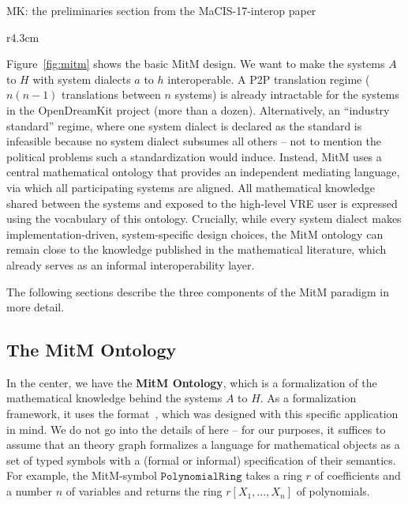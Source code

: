 \begin{newpart}{MK: the preliminaries section from the MaCIS-17-interop paper}
  \begin{wrapfigure}r{4.3cm}\vspace*{-2em}
  \vspace*{-1em}
  \caption{MitM Paradigm}\label{fig:mitm}\vspace*{-1.5em}
\end{wrapfigure}
Figure~\ref{fig:mitm} shows the basic MitM design.
We want to make the systems $A$ to $H$ with system dialects $a$ to $h$ interoperable.
A P2P translation regime ($n(n-1)$ translations between $n$ systems) is already intractable for the systems in the OpenDreamKit project (more than a dozen).
Alternatively, an ``industry standard'' regime, where one system dialect is declared as the standard is infeasible because no system dialect subsumes all others -- not to mention the political problems such a standardization would induce.
Instead, MitM uses a central mathematical ontology that provides an independent mediating language, via which all participating systems are aligned.
All mathematical knowledge shared between the systems and exposed to the high-level VRE user is expressed using the vocabulary of this ontology.
Crucially, while every system dialect makes implementation-driven, system-specific design choices, the MitM ontology can remain close to the knowledge published in the mathematical literature, which already serves as an informal interoperability layer.

The following sections describe the three components of the MitM paradigm in more detail.

\subsection{The MitM Ontology}\label{sec:mitm:recap}

In the center, we have the \textbf{MitM Ontology}, which is a formalization of
the mathematical knowledge behind the systems $A$ to $H$.
As a formalization framework, it uses the \OMMT format~\cite{Kohlhase:OMDoc1.2,RabKoh:WSMSML13,uniformal:on}, which was designed with this specific application in mind.
We do not go into the details of \OMMT here -- for our purposes, it
suffices to assume that an \OMMT theory graph formalizes a language for mathematical objects as a set of typed symbols with a (formal or informal) specification of their semantics.
For example, the MitM-symbol $\mathtt{PolynomialRing}$ takes a ring $r$ of coefficients and a number $n$ of variables and returns the ring $r[X_1,\ldots,X_n]$ of polynomials.


\end{newpart}
